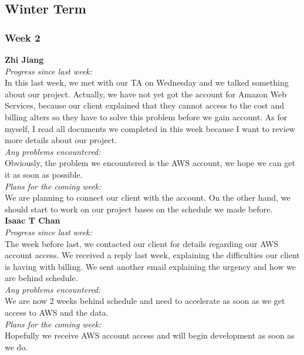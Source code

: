\subsection{Winter Term}
\subsubsection{Week 2}
\textbf{Zhi Jiang}\\
\noindent\textit{Progress since last week:}\\
In this last week, we met with our TA on Wednesday and we talked something about our project. Actually, we have not yet got the account for Amazon Web Services, because our client explained that they cannot access to the cost and billing alters so they have to solve this problem before we gain account. As for myself, I read all documents we completed in this week because I want to review more details about our project.\\

\noindent\textit{Any problems encountered:}\\
Obviously, the problem we encountered is the AWS account, we hope we can get it as soon as possible.\\

\noindent\textit{Plans for the coming week:}\\
We are planning to connect our client with the account. On the other hand, we should start to work on our project bases on the schedule we made before.\\

\noindent\textbf{Isaac T Chan}\\
\noindent\textit{Progress since last week:}\\
The week before last, we contacted our client for details regarding our AWS account access. We received a reply last week, explaining the difficulties our client is having with billing. We sent another email explaining the urgency and how we are behind schedule.\\

\noindent\textit{Any problems encountered:}\\
We are now 2 weeks behind schedule and need to accelerate as soon as we get access to AWS and the data.\\

\noindent\textit{Plans for the coming week:}\\
Hopefully we receive AWS account access and will begin development as soon as we do.\\

